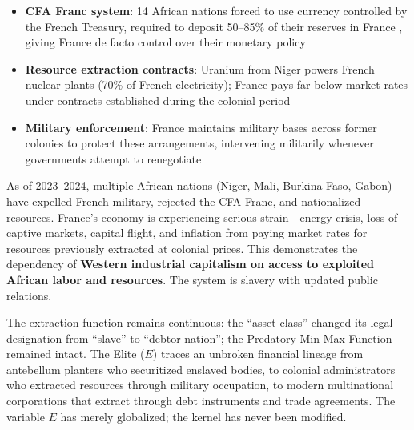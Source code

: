 \begin{itemize}
    \item \textbf{CFA Franc system}: 14 African nations forced to use currency controlled by the French Treasury, required to deposit 50--85\% of their reserves in France \cite{pigeaud}, giving France de facto control over their monetary policy
    \item \textbf{Resource extraction contracts}: Uranium from Niger powers French nuclear plants (70\% of French electricity); France pays far below market rates under contracts established during the colonial period
    \item \textbf{Military enforcement}: France maintains military bases across former colonies to protect these arrangements, intervening militarily whenever governments attempt to renegotiate
\end{itemize}

As of 2023--2024, multiple African nations (Niger, Mali, Burkina Faso, Gabon) have expelled French military, rejected the CFA Franc, and nationalized resources. France's economy is experiencing serious strain---energy crisis, loss of captive markets, capital flight, and inflation from paying market rates for resources previously extracted at colonial prices. This demonstrates the dependency of \textbf{Western industrial capitalism on access to exploited African labor and resources}. The system is slavery with updated public relations.

The extraction function remains continuous: the ``asset class'' changed its legal designation from ``slave'' to ``debtor nation''; the Predatory Min-Max Function remained intact. The Elite ($E$) traces an unbroken financial lineage from antebellum planters who securitized enslaved bodies, to colonial administrators who extracted resources through military occupation, to modern multinational corporations that extract through debt instruments and trade agreements. The variable $E$ has merely globalized; the kernel has never been modified.

